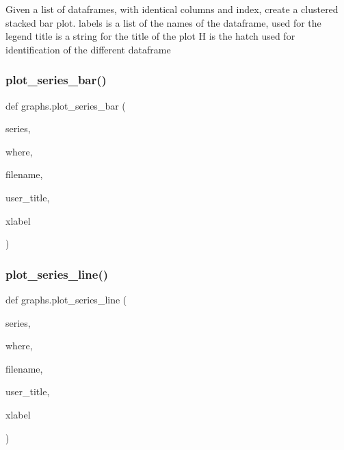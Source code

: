 \begin{DoxyVerb}Given a list of dataframes, with identical columns and index, create a clustered stacked bar plot. 
labels is a list of the names of the dataframe, used for the legend
title is a string for the title of the plot
H is the hatch used for identification of the different dataframe\end{DoxyVerb}
 \mbox{\label{namespacegraphs_a17811242c6ee87a679847b61f94d8404}} 
\subsubsection{\texorpdfstring{plot\+\_\+series\+\_\+bar()}{plot\_series\_bar()}}
{\footnotesize\ttfamily def graphs.\+plot\+\_\+series\+\_\+bar (\begin{DoxyParamCaption}\item[{}]{series,  }\item[{}]{where,  }\item[{}]{filename,  }\item[{}]{user\+\_\+title,  }\item[{}]{xlabel }\end{DoxyParamCaption})}

\mbox{\label{namespacegraphs_af558d7a2b643f747f656fd0ae50a243b}} 
\subsubsection{\texorpdfstring{plot\+\_\+series\+\_\+line()}{plot\_series\_line()}}
{\footnotesize\ttfamily def graphs.\+plot\+\_\+series\+\_\+line (\begin{DoxyParamCaption}\item[{}]{series,  }\item[{}]{where,  }\item[{}]{filename,  }\item[{}]{user\+\_\+title,  }\item[{}]{xlabel }\end{DoxyParamCaption})}

\mbox{\label{namespacegraphs_a727b6df37fad8bf4be3fa2d9691c47b3}} 
